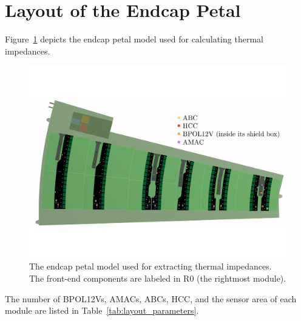 
\section{Layout of the Endcap Petal}

Figure~\ref{endcap_model} depicts the endcap petal model used for calculating thermal impedances.

\begin{figure}[ht!]
\begin{center}
\includegraphics[width=0.99\linewidth]{figures/m30C_0Wm2C_Setup_BPOL12V.pdf}
\end{center}
\caption{The endcap petal model used for extracting thermal impedances. The front-end components are
labeled in R0 (the rightmost module).}
\label{endcap_model}
\end{figure}

The number of BPOL12Vs, AMACs, ABCs, HCC, and the sensor area of each module are listed in
Table~\ref{tab:layout_parameters}.
%
\let\arraystretcha\arraystretch
\renewcommand\arraystretch{1.1} %
\begin{table}[h]
\begin{center}
\end{center}
\caption{Number of components on each module.}
\label{tab:layout_parameters}
\end{table}
\let\arraystretch\arraystretcha


